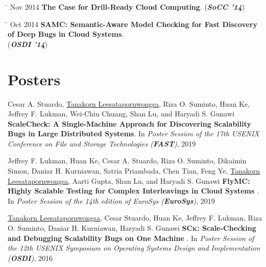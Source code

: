 \documentclass[10pt]{article} %
\begin{document}
\begin{tabbing}
\hspace{2.5cm} \= \kill
Nov 2014 \> \textbf{The Case for Drill-Ready Cloud Computing}. (\textbf{\textit{SoCC '14}})
\end{tabbing}

\begin{tabbing}
\hspace{2.5cm} \= \kill
Oct 2014 \> \textbf{SAMC: Semantic-Aware Model Checking for Fast Discovery of Deep Bugs in Cloud Systems}. \\
\> (\textbf{\textit{OSDI '14}})
\end{tabbing}



\section{Posters}

Cesar A. Stuardo, \underline{Tanakorn Leesatapornwongsa}, Riza O. Suminto, Huan
Ke, Jeffrey F. Lukman, Wei-Chiu Chuang, Shan Lu, and Haryadi S. Gunawi
\textbf{ScaleCheck: A Single-Machine Approach for Discovering Scalability Bugs
in Large Distributed Systems}. In \textit{Poster Session of the 17th
USENIX Conference on File and Storage Technologies (\textbf{FAST})}, 2019
\vspace{2mm}

Jeffrey F. Lukman, Huan Ke, Cesar A. Stuardo, Riza O. Suminto, Dikaimin Simon,
Daniar H. Kurniawan, Satria Priambada, Chen Tian, Feng Ye, \underline{Tanakorn
Leesatapornwongsa}, Aarti Gupta, Shan Lu, and Haryadi S. Gunawi \textbf{FlyMC:
Highly Scalable Testing for Complex Interleavings in Cloud Systems }. In 
\textit{Poster Session of the 14th edition of EuroSys
(\textbf{EuroSys})}, 2019 
\vspace{2mm}

\underline{Tanakorn Leesatapornwongsa,} Cesar Stuardo, Huan Ke, Jeffrey F.
Lukman, Riza O. Suminto, Daniar H. Kurniawan, Haryadi S. Gunawi
\textbf{\textsc{SCk}: Scale-Checking and Debugging Scalability Bugs on One
Machine }. In \textit{Poster Session of the 12th USENIX Symposium on Operating
Systems Design and Implementation (\textbf{OSDI})}, 2016
\vspace{2mm}
\end{document}
